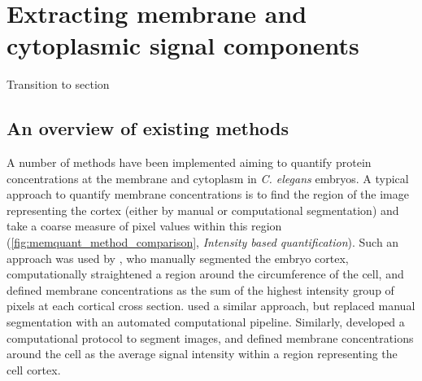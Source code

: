 \documentclass[12pt]{"report"}
\begin{document}
\clearpage
\section{Extracting membrane and cytoplasmic signal components}
\label{section:memquant}

Transition to section

\subsection{An overview of existing methods}

A number of methods have been implemented aiming to quantify protein concentrations at the membrane and cytoplasm in \textit{C. elegans} embryos. A typical approach to quantify membrane concentrations is to find the region of the image representing the cortex (either by manual or computational segmentation) and take a coarse measure of pixel values within this region (\cref{fig:memquant_method_comparison}, \textit{Intensity based quantification}). Such an approach was used by \textcite{Goehring2011a}, who manually segmented the embryo cortex, computationally straightened a region around the circumference of the cell, and defined membrane concentrations as the sum of the highest intensity group of pixels at each cortical cross section. \textcite{Hubatsch2019a} used a similar approach, but replaced manual segmentation with an automated computational pipeline. Similarly, \textcite{Zhang2017} developed a computational protocol to segment images, and defined membrane concentrations around the cell as the average signal intensity within a region representing the cell cortex.\\
\end{document}
